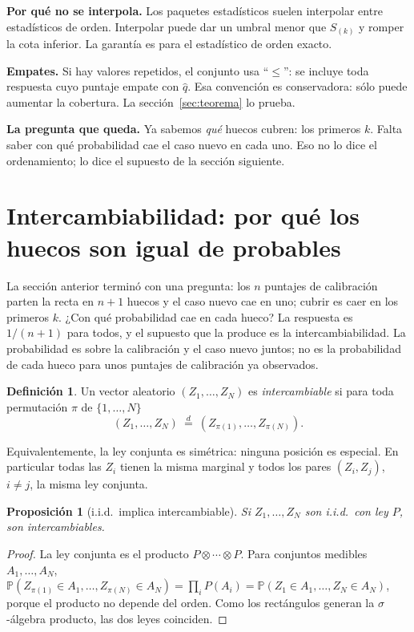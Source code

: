 \documentclass[11pt]{article}
\theoremstyle{plain}
\newtheorem{proposicion}[teorema]{Proposición}
\theoremstyle{definition}
\newtheorem{definicion}[teorema]{Definición}
\theoremstyle{remark}
\newcommand{\Prob}{\mathbb P}
\newcommand{\qhat}{\widehat q}
\newcommand{\eqd}{\overset{d}{=}}
\newcommand{\dest}[1]{\par\needspace{4\baselineskip}\textbf{#1}\quad}
\begin{document}
\dest{Por qué no se interpola.} Los paquetes estadísticos suelen interpolar entre estadísticos de
orden. Interpolar puede dar un umbral menor que $S_{(k)}$ y romper la cota inferior. La garantía es
para el estadístico de orden exacto.

\dest{Empates.} Si hay valores repetidos, el conjunto usa ``$\le$'': se incluye toda respuesta cuyo
puntaje empate con $\qhat$. Esa convención es conservadora: sólo puede aumentar la cobertura. La
sección~\ref{sec:teorema} lo prueba.

\dest{La pregunta que queda.} Ya sabemos \emph{qué} huecos cubren: los primeros $k$. Falta saber con
qué probabilidad cae el caso nuevo en cada uno. Eso no lo dice el ordenamiento; lo dice el supuesto
de la sección siguiente.

\section{Intercambiabilidad: por qué los huecos son igual de probables}\label{sec:intercambiabilidad}
La sección anterior terminó con una pregunta: los $n$ puntajes de calibración parten la recta en
$n+1$ huecos y el caso nuevo cae en uno; cubrir es caer en los primeros $k$. ¿Con qué probabilidad cae
en cada hueco? La respuesta es $1/(n+1)$ para todos, y el supuesto que la produce es la
intercambiabilidad. La probabilidad es sobre la calibración y el caso nuevo juntos; no es la
probabilidad de cada hueco para unos puntajes de calibración ya observados.


\begin{definicion}
Un vector aleatorio $(Z_1,\dots,Z_{N})$ es \emph{intercambiable} si para toda permutación $\pi$ de
$\{1,\dots,N\}$
\[
 (Z_1,\dots,Z_N)\ \eqd\ (Z_{\pi(1)},\dots,Z_{\pi(N)}).
\]
\end{definicion}
Equivalentemente, la ley conjunta es simétrica: ninguna posición es especial. En particular todas las
$Z_i$ tienen la misma marginal y todos los pares $(Z_i,Z_j)$, $i\ne j$, la misma ley conjunta.

\begin{proposicion}[i.i.d.\ implica intercambiable]
Si $Z_1,\dots,Z_N$ son i.i.d.\ con ley $P$, son intercambiables.
\end{proposicion}
\begin{proof}
La ley conjunta es el producto $P\otimes\cdots\otimes P$. Para conjuntos medibles $A_1,\dots,A_N$,
$\Prob(Z_{\pi(1)}\in A_1,\dots,Z_{\pi(N)}\in A_N)=\prod_i P(A_i)=\Prob(Z_1\in A_1,\dots,Z_N\in A_N)$,
porque el producto no depende del orden. Como los rectángulos generan la $\sigma$-álgebra producto,
las dos leyes coinciden.
\end{proof}
\end{document}
